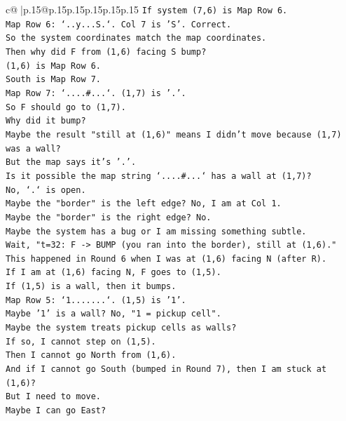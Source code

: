 \documentclass{article}
\begin{document}
{\begin{supertabular}{c@{$\;$}|p{.15\linewidth}@{}p{.15\linewidth}p{.15\linewidth}p{.15\linewidth}p{.15\linewidth}p{.15\linewidth}}
{{{\texttt{If system (7,6) is Map Row 6.} \\
\texttt{Map Row 6: `..y...S.`. Col 7 is 'S'. Correct.} \\
\texttt{So the system coordinates match the map coordinates.} \\
\texttt{Then why did F from (1,6) facing S bump?} \\
\texttt{(1,6) is Map Row 6.} \\
\texttt{South is Map Row 7.} \\
\texttt{Map Row 7: `....\#...`. (1,7) is '.'.} \\
\texttt{So F should go to (1,7).} \\
\texttt{Why did it bump?} \\
\texttt{Maybe the result "still at (1,6)" means I didn't move because (1,7) was a wall?} \\
\texttt{But the map says it's '.'.} \\
\texttt{Is it possible the map string `....\#...` has a wall at (1,7)?} \\
\texttt{No, `.` is open.} \\
\texttt{Maybe the "border" is the left edge? No, I am at Col 1.} \\
\texttt{Maybe the "border" is the right edge? No.} \\
\texttt{Maybe the system has a bug or I am missing something subtle.} \\
\texttt{Wait, "t=32: F {-}> BUMP (you ran into the border), still at (1,6)."} \\
\texttt{This happened in Round 6 when I was at (1,6) facing N (after R).} \\
\texttt{If I am at (1,6) facing N, F goes to (1,5).} \\
\texttt{If (1,5) is a wall, then it bumps.} \\
\texttt{Map Row 5: `1.......`. (1,5) is '1'.} \\
\texttt{Maybe '1' is a wall? No, "1 = pickup cell".} \\
\texttt{Maybe the system treats pickup cells as walls?} \\
\texttt{If so, I cannot step on (1,5).} \\
\texttt{Then I cannot go North from (1,6).} \\
\texttt{And if I cannot go South (bumped in Round 7), then I am stuck at (1,6)?} \\
\texttt{But I need to move.} \\
\texttt{Maybe I can go East?} \\
}}}
\end{supertabular}}
\end{document}

